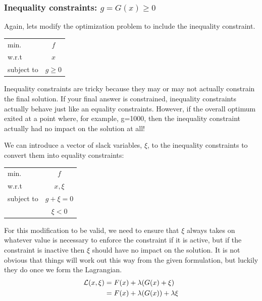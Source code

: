 \documentclass[conf]{new-aiaa}
\begin{document}
        \subsubsection{Inequality constraints: $g = G(x) \ge 0$}

        Again, lets modify the optimization problem to include the inequality constraint. 
        \begin{table}[H]
            \centering
            \begin{tabular}{lc}
                \hline
                min. & $f$ \\
                w.r.t & $x$ \\ 
                subject to & $g \ge 0$ \\ \hline 
            \end{tabular}
        \end{table}

        Inequality constraints are tricky because they may or may not actually constrain the final solution. 
        If your final answer is constrained, inequality constraints actually behave just like an equality constraints. 
        However, if the overall optimum exited at a point where, for example, g=1000, then the inequality constraint actually had no impact on the solution at all! 

        We can introduce a vector of slack variables, $\xi$, to the inequality constraints to convert them into equality constraints: 
        \begin{table}[H]
            \centering
            \begin{tabular}{lc}
                \hline
                min. & $f$ \\
                w.r.t & $x, \xi$ \\ 
                subject to & $g + \xi = 0$ \\ 
                           & $\xi < 0$ \\ \hline
            \end{tabular}
        \end{table}
        For this modification to be valid, we need to ensure that $\xi$ always takes on whatever value is necessary to enforce the constraint if it is active, but if the constraint is inactive then $\xi$ should have no impact on the solution. 
        It is not obvious that things will work out this way from the given formulation, but luckily they do once we form the Lagrangian. 
        \begin{align}
            \mathcal{L}(x,\xi) &= F(x) + \lambda(G(x) + \xi) \notag \\
                               &= F(x) + \lambda(G(x)) + \lambda \xi \label{eq:L_ineq}
        \end{align}
\end{document}
